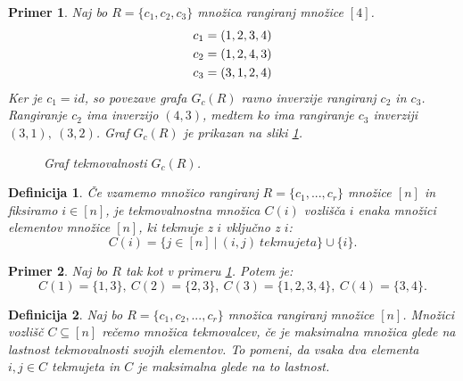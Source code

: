 \documentclass[a4paper, 12pt]{book}
\newtheorem{definicija}{Definicija}[chapter]
\newtheorem{primer}{Primer}[chapter]
\begin{document}
\begin{primer}
\label{primer_tekmovalnostni_graf}
    Naj bo $R = \{ c_1, c_2, c_3 \}$ množica rangiranj množice $[4]$.
    \begin{align*}
        c_1 &= (1, 2, 3, 4) \notag\\
        c_2 &= (1, 2, 4, 3) \notag\\
        c_3 &= (3, 1, 2, 4) \notag
    \end{align*}
    Ker je $c_1=id$, so povezave grafa $G_c(R)$ ravno inverzije rangiranj $c_2$ in $c_3$. Rangiranje $c_2$ ima inverzijo $(4, 3)$, medtem ko ima rangiranje $c_3$ inverziji $(3, 1), \ (3, 2)$. Graf $G_c(R)$ je prikazan na sliki \ref{graf_tekmovalnosti_primer}.
    \begin{figure}[h]
        \begin{center}
        \end{center}
        \caption{Graf tekmovalnosti $G_c(R)$.}
        \label{graf_tekmovalnosti_primer}
    \end{figure}
\end{primer}


\begin{definicija}
    Če vzamemo množico rangiranj $R = \{ c_1, ..., c_r \}$ množice $[n]$ in fiksiramo $i \in [n]$, je tekmovalnostna množica $C(i)$ vozlišča $i$ enaka množici elementov množice $[n]$, ki tekmuje z $i$ vključno z $i$:
    \[
        C(i) = \{ j \in [n] \ | \ (i, j) \ tekmujeta \} \cup \{ i \}.
    \]
\end{definicija}

\begin{primer}
    Naj bo $R$ tak kot v primeru \ref{primer_tekmovalnostni_graf}. Potem je:
    \[
        C(1) = \{ 1, 3 \}, \ C(2) = \{ 2, 3 \}, \ C(3) = \{ 1, 2, 3, 4 \}, \ C(4) = \{ 3, 4 \}.
    \]
\end{primer}

\begin{definicija}
    Naj bo $R = \{ c_1, c_2, ..., c_r\}$ množica rangiranj množice $[n]$. Množici  vozlišč $C \subseteq [n]$ rečemo množica tekmovalcev, če je maksimalna množica glede na lastnost tekmovalnosti svojih elementov. To pomeni, da vsaka dva elementa $i, j \in C$ tekmujeta in $C$ je maksimalna glede na to lastnost.
\end{definicija}
\end{document}

